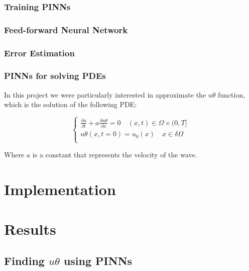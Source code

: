 \documentclass{article}
\begin{document}
\subsubsection{Training PINNs}

\subsubsection{Feed-forward Neural Network}

\subsubsection{Error Estimation}


\subsubsection{PINNs for solving PDEs} 


In this project we were particularly interested in approximate the $u\theta$ function, which is the solution of the following PDE:

\begin{equation*}
    \begin{cases}
    \frac{\partial u}{\partial t} + a \frac{\partial u\theta}{\partial x} = 0 \quad (x,t) \in \Omega \times (0,T] \\
    u\theta(x,t=0) = u_0(x) \quad x \in \delta \Omega \\
    \end{cases}
\end{equation*}

Where $a$ is a constant that represents the velocity of the wave. 


\section{Implementation}


\section{Results}
\subsection{Finding $u\theta$ using PINNs}
\end{document}

